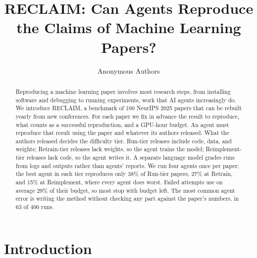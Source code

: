 \documentclass{article} %
\title{RECLAIM: Can Agents Reproduce the Claims of Machine Learning Papers?}
\author{Anonymous Authors}
\begin{document}
\raggedbottom

\maketitle

\begin{abstract}
Reproducing a machine learning paper involves most research steps, from
installing software and debugging to running experiments, work that AI agents
increasingly do. We introduce RECLAIM, a benchmark of 100 NeurIPS 2025 papers
that can be rebuilt yearly from new conferences. For each paper we fix in
advance the result to reproduce, what counts as a successful reproduction, and
a GPU-hour budget. An agent must reproduce that result using the paper and
whatever its authors released. What the authors released decides the
difficulty tier. Run-tier releases include code, data, and weights;
Retrain-tier releases lack weights, so the agent trains the model;
Reimplement-tier releases lack code, so the agent writes it. A separate
language model grades runs from logs and outputs rather than agents' reports.
We run four agents once per paper; the best agent in each tier reproduces only
38\% of Run-tier papers, 27\% at Retrain, and 15\% at Reimplement, where every
agent does worst. Failed attempts use on average 29\% of their budget, so most
stop with budget left. The most common agent error is writing the method
without checking any part against the paper's numbers, in 63 of 400
runs.
\end{abstract}

\section{Introduction}
\label{sec:introduction}
\end{document}
